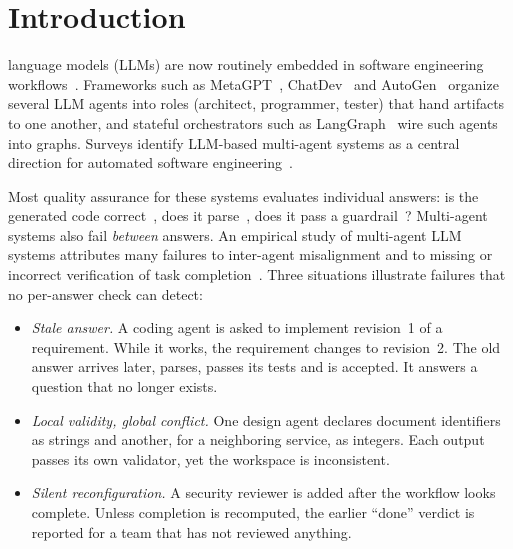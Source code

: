 \section{Introduction}\label{sec:intro}
 language models (LLMs) are now routinely embedded in software engineering workflows~\cite{hou2024llm4se}. Frameworks such as MetaGPT~\cite{metagpt}, ChatDev~\cite{chatdev} and AutoGen~\cite{autogen} organize several LLM agents into roles (architect, programmer, tester) that hand artifacts to one another, and stateful orchestrators such as LangGraph~\cite{langgraph} wire such agents into graphs. Surveys identify LLM-based multi-agent systems as a central direction for automated software engineering~\cite{he2025mas,wang2024agents}.

Most quality assurance for these systems evaluates individual answers: is the generated code correct~\cite{evalplus,swebench}, does it parse~\cite{synchromesh,outlines}, does it pass a guardrail~\cite{nemoguardrails}? Multi-agent systems also fail \emph{between} answers. An empirical study of multi-agent LLM systems attributes many failures to inter-agent misalignment and to missing or incorrect verification of task completion~\cite{cemri2025mast}. Three situations illustrate failures that no per-answer check can detect:
\begin{itemize}
\item \emph{Stale answer.} A coding agent is asked to implement revision~1 of a requirement. While it works, the requirement changes to revision~2. The old answer arrives later, parses, passes its tests and is accepted. It answers a question that no longer exists.
\item \emph{Local validity, global conflict.} One design agent declares document identifiers as strings and another, for a neighboring service, as integers. Each output passes its own validator, yet the workspace is inconsistent.
\item \emph{Silent reconfiguration.} A security reviewer is added after the workflow looks complete. Unless completion is recomputed, the earlier ``done'' verdict is reported for a team that has not reviewed anything.
\end{itemize}

